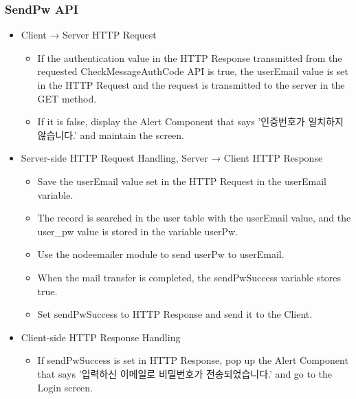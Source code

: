 \documentclass[conference]{IEEEtran}
\begin{document}
\subsubsection{SendPw API}
\begin{itemize}
    \item Client → Server HTTP Request
    \begin{itemize}
        \item If the authentication value in the HTTP Response transmitted from the requested CheckMessageAuthCode API is true, the userEmail value is set in the HTTP Request and the request is transmitted to the server in the GET method.
        \item If it is false, display the Alert Component that says '인증번호가 일치하지 않습니다.' and maintain the screen.
        \\
    \end{itemize}
    \item Server-side HTTP Request Handling, Server → Client HTTP Response
    \begin{itemize}
        \item Save the userEmail value set in the HTTP Request in the userEmail variable.
        \item The record is searched in the user table with the userEmail value, and the user\_pw value is stored in the variable userPw.
        \item Use the nodeemailer module to send userPw to userEmail.
        \item When the mail transfer is completed, the sendPwSuccess variable stores true.
        \item Set sendPwSuccess to HTTP Response and send it to the Client.
    \end{itemize}
    \item Client-side HTTP Response Handling
    \begin{itemize}
        \item If sendPwSuccess is set in HTTP Response, pop up the Alert Component that says '입력하신 이메일로 비밀번호가 전송되었습니다.' and go to the Login screen.
    \end{itemize}
\end{itemize}
\end{document}
